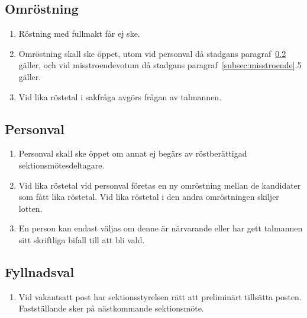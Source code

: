 \documentclass[11pt,a4paper]{article}
\begin{document}
\subsection{Omröstning}

\begin{enumerate}[\thesubsection.1]

  \item Röstning med fullmakt får ej ske.

  \item Omröstning skall ske öppet, utom vid personval då stadgans
  paragraf~\ref{subsec:personval} gäller, och vid misstroendevotum då stadgans paragraf~\ref{subsec:misstroende}.5 gäller.

  \item Vid lika röstetal i sakfråga avgörs frågan av talmannen.

\end{enumerate}

\subsection{Personval}\label{subsec:personval}

\begin{enumerate}[\thesubsection.1]
  
  \item Personval skall ske öppet om annat ej begärs av röstberättigad sektionsmötesdeltagare.
  
  \item Vid lika röstetal vid personval företas en ny omröstning mellan de kandidater som fått lika röstetal. Vid lika röstetal i den andra omröstningen skiljer lotten.
  
  \item En person kan endast väljas om denne är närvarande eller har gett talmannen sitt skriftliga bifall till att bli vald.

\end{enumerate}

\subsection{Fyllnadsval}

\begin{enumerate}[\thesubsection.1]

  \item Vid vakantsatt post har sektions\-styr\-elsen rätt att preliminärt tillsätta posten. Fastställande sker på näst\-komm\-ande sektionsmöte.

\end{enumerate}
\end{document}
